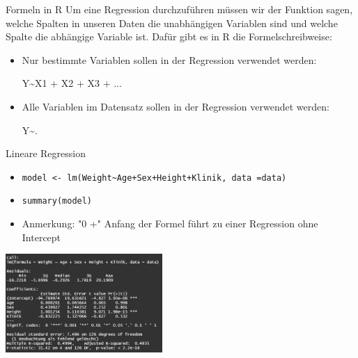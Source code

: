 \documentclass[aspectratio = 169]{chariteBeamer}
\begin{document}
\begin{frame}[fragile]{Formeln in R}
	Um eine Regression durchzuführen müssen wir der Funktion sagen, welche Spalten in unseren Daten die unabhängigen Variablen sind und welche Spalte die abhängige Variable ist. Dafür gibt	es in R die Formelschreibweise:
	\begin{itemize}
		\item Nur bestimmte Variablen sollen in der Regression verwendet werden:
			\begin{center}
				Y\textasciitilde X1 + X2 + X3 + ... 
			\end{center}
		\item Alle Variablen im Datensatz sollen in der Regression verwendet werden:
			\begin{center}
				Y\textasciitilde.
			\end{center}
	\end{itemize}
\end{frame}



\begin{frame}[fragile]{Lineare Regression}
	\begin{itemize}
		\item \verb"model <- lm(Weight~Age+Sex+Height+Klinik, data =data)"
		\item \verb+summary(model)+
		\item Anmerkung: "0 +"  Anfang der Formel führt zu einer Regression ohne Intercept 
	\end{itemize}
			
	\begin{center}
		\includegraphics[height=3.75cm]{LinearRegressionSummary}
	\end{center}
\end{frame}
\end{document}
